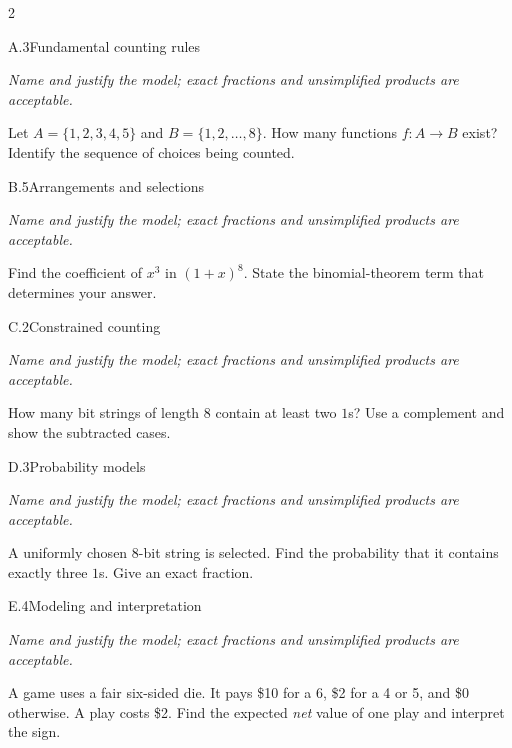\documentclass[9pt]{extarticle}
\begin{document}
\begin{multicols}{2}
\begin{CoreProblem}{A.3}{Fundamental counting rules}
{\scriptsize\textit{Name and justify the model; exact fractions and unsimplified products are acceptable.}\par}
Let $A=\{1,2,3,4,5\}$ and $B=\{1,2,\ldots,8\}$. How many functions
    $f:A\to B$ exist? Identify the sequence of choices being counted.
\end{CoreProblem}
\begin{CoreProblem}{B.5}{Arrangements and selections}
{\scriptsize\textit{Name and justify the model; exact fractions and unsimplified products are acceptable.}\par}
Find the coefficient of $x^3$ in $(1+x)^8$. State the binomial-theorem
    term that determines your answer.
\end{CoreProblem}
\begin{CoreProblem}{C.2}{Constrained counting}
{\scriptsize\textit{Name and justify the model; exact fractions and unsimplified products are acceptable.}\par}
How many bit strings of length 8 contain at least two $1$s? Use a
    complement and show the subtracted cases.
\end{CoreProblem}
\columnbreak
\begin{CoreProblem}{D.3}{Probability models}
{\scriptsize\textit{Name and justify the model; exact fractions and unsimplified products are acceptable.}\par}
A uniformly chosen 8-bit string is selected. Find the probability
    that it contains exactly three $1$s. Give an exact fraction.
\end{CoreProblem}
\begin{CoreProblem}{E.4}{Modeling and interpretation}
{\scriptsize\textit{Name and justify the model; exact fractions and unsimplified products are acceptable.}\par}
A game uses a fair six-sided die. It pays \$10 for a 6, \$2 for a 4
    or 5, and \$0 otherwise. A play costs \$2. Find the expected \emph{net}
    value of one play and interpret the sign.
\end{CoreProblem}
\end{multicols}
\CoreWorkArea
\FormBreak
{}
\end{document}
